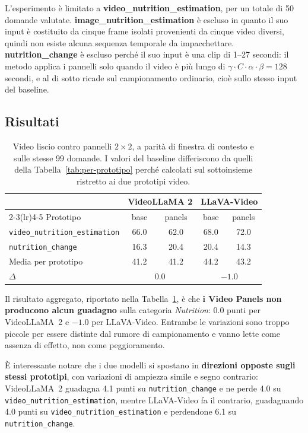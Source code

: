 \documentclass{article}
\begin{document}
L'esperimento è limitato a \textbf{video\_nutrition\allowbreak\_estimation}, per un
totale di 50 domande valutate. \textbf{image\_nutrition\allowbreak\_estimation} è
escluso in quanto il suo input è costituito da cinque frame isolati provenienti
da cinque video diversi, quindi non esiste alcuna sequenza temporale da
impacchettare. \textbf{nutrition\allowbreak\_change} è escluso perché il suo input è
una clip di 1--27 secondi: il metodo applica i pannelli solo quando il video è più
lungo di $\gamma \cdot C \cdot \alpha \cdot \beta = 128$ secondi, e al di sotto
ricade sul campionamento ordinario, cioè sullo stesso input del baseline.

\subsection{Risultati}

\begin{table}[htbp]
\centering
\small
\begin{tabular}{@{}lcccc@{}}
\toprule
& \multicolumn{2}{c}{VideoLLaMA 2} & \multicolumn{2}{c}{LLaVA-Video} \\
\cmidrule(lr){2-3}\cmidrule(lr){4-5}
Prototipo & base & panels & base & panels \\
\midrule
\texttt{video\_nutrition\_estimation} & 66.0 & 62.0 & 68.0 & 72.0 \\
\texttt{nutrition\_change} & 16.3 & 20.4 & 20.4 & 14.3 \\
\midrule
Media per prototipo        & 41.2 & 41.2 & 44.2 & 43.2 \\
$\Delta$                   & \multicolumn{2}{c}{$0.0$} & \multicolumn{2}{c}{$-1.0$} \\
\bottomrule
\end{tabular}
\caption{Video liscio contro pannelli $2\times2$, a parità di finestra di
contesto e sulle stesse 99 domande. I valori del baseline differiscono da quelli
della Tabella~\ref{tab:per-prototipo} perché calcolati sul sottoinsieme
ristretto ai due prototipi video.}
\label{tab:panels}
\end{table}

Il risultato aggregato, riportato nella Tabella~\ref{tab:panels}, è che
\textbf{i Video Panels non producono alcun guadagno} sulla categoria
\emph{Nutrition}: $0.0$ punti per VideoLLaMA~2 e $-1.0$ per LLaVA-Video.
Entrambe le variazioni sono troppo piccole per essere distinte dal rumore di
campionamento e vanno lette come assenza di effetto, non come peggioramento.

È interessante notare che i due modelli
si spostano in \textbf{direzioni opposte sugli stessi prototipi}, con variazioni
di ampiezza simile e segno contrario: VideoLLaMA~2 guadagna 4.1 punti su
\texttt{nutrition\_change} e ne perde 4.0 su
\texttt{video\_nutrition\_estimation}, mentre LLaVA-Video fa il contrario,
guadagnando 4.0 punti su \texttt{video\_nutrition\_estimation} e perdendone 6.1 su
\texttt{nutrition\_change}.
\end{document}
